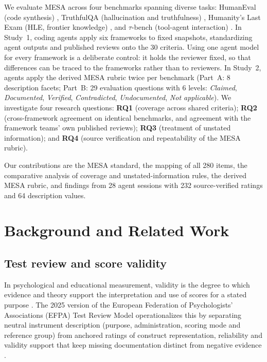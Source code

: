\documentclass[10pt,conference]{IEEEtran}
\begin{document}
We evaluate MESA across four benchmarks spanning diverse tasks: HumanEval (code synthesis) \cite{human_eval_repository}, TruthfulQA (hallucination and truthfulness) \cite{truthfulqa_repository}, Humanity's Last Exam (HLE, frontier knowledge) \cite{phan_etal_hle_2025}, and $\tau$-bench (tool-agent interaction) \cite{tau_bench_repository}. In Study~1, coding agents apply six frameworks to fixed snapshots, standardizing agent outputs and published reviews onto the 30 criteria. Using one agent model for every framework is a deliberate control: it holds the reviewer fixed, so that differences can be traced to the frameworks rather than to reviewers. In Study~2, agents apply the derived MESA rubric twice per benchmark (Part~A: 8 description facets; Part~B: 29 evaluation questions with 6 levels: \emph{Claimed}, \emph{Documented}, \emph{Verified}, \emph{Contradicted}, \emph{Undocumented}, \emph{Not applicable}). We investigate four research questions: \textbf{RQ1} (coverage across shared criteria); \textbf{RQ2} (cross-framework agreement on identical benchmarks, and agreement with the framework teams' own published reviews); \textbf{RQ3} (treatment of unstated information); and \textbf{RQ4} (source verification and repeatability of the MESA rubric).

Our contributions are the MESA standard, the mapping of all 280 items, the comparative analysis of coverage and unstated-information rules, the derived MESA rubric, and findings from 28 agent sessions with 232 source-verified ratings and 64 description values.

\section{Background and Related Work}
\subsection{Test review and score validity}
In psychological and educational measurement, validity is the degree to which evidence and theory support the interpretation and use of scores for a stated purpose \cite{kane_validation,aera_apa_ncme_standards_2014}. The 2025 version of the European Federation of Psychologists' Associations (EFPA) Test Review Model operationalizes this by separating neutral instrument description (purpose, administration, scoring mode and reference group) from anchored ratings of construct representation, reliability and validity support that keep missing documentation distinct from negative evidence \cite{efpa_test_review_model_2025}.
\end{document}
